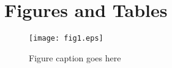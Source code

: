 \documentclass[12pt,english]{article}
\begin{document}
\vfill
\pagebreak{}
\begin{spacing}{1.0}


\end{spacing}

\vfill
\pagebreak{}
\clearpage

\section*{Figures and Tables}\label{sec:figTables}
\begin{figure}[ht]
\centering
\bigskip{}
\texttt{[image: fig1.eps]}
\caption{Figure caption goes here}
\label{fig:fig1}
\end{figure}
\end{document}
